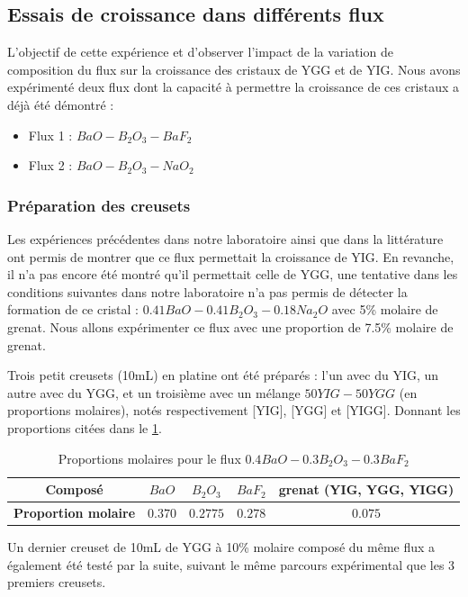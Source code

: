 \documentclass{rapportENSCP}
\begin{document}
\subsection{Essais de croissance dans différents flux }
L'objectif de cette expérience et d'observer l'impact de la variation de composition du flux sur la croissance des cristaux de YGG et de YIG. Nous avons expérimenté deux flux dont la capacité à permettre la croissance de ces cristaux a déjà été démontré : 

\begin{itemize}
    \item Flux 1 : $BaO - B_2O_3 - BaF_2$
    \item Flux 2 : $BaO - B_2O_3 - NaO_2$
\end{itemize}

\subsubsection{Préparation des creusets}
Les expériences précédentes dans notre laboratoire ainsi que dans la littérature ont permis de montrer que ce flux permettait la croissance de YIG. En revanche, il n'a pas encore été montré qu'il permettait celle de YGG, une tentative dans les conditions suivantes dans notre laboratoire n'a pas permis de détecter la formation de ce cristal :
$0.41BaO - 0.41B_2O_3- 0.18Na_2O$ avec 5\% molaire de grenat. Nous allons expérimenter ce flux avec une proportion de 7.5\% molaire de grenat. 

Trois petit creusets (10mL) en platine ont été préparés : l’un avec du YIG, un autre avec du YGG, et un troisième avec un mélange $50YIG-50YGG$ (en proportions molaires), notés respectivement [YIG], [YGG] et [YIGG]. Donnant les proportions citées dans le \ref{tab:composition_flux_1}.

\begin{table}[h]
\centering
\begin{tabular}{|c|c|c|c|c|}
    \hline
    \textbf{Composé} & $BaO$ & $B_2O_3$ & $BaF_2$ & grenat (YIG, YGG, YIGG) \\
    \hline
    \textbf{Proportion molaire} & $0.370$ & $0.2775$ & $0.278$ & $0.075$ \\
    \hline
\end{tabular}
\caption{Proportions molaires pour le flux $0.4BaO - 0.3B_2O_3 - 0.3BaF_2$}
\label{tab:composition_flux_1}
\end{table}

Un dernier creuset de 10mL de YGG à 10\% molaire composé du même flux a également été testé par la suite, suivant le même parcours expérimental que les 3 premiers creusets.
\end{document}
